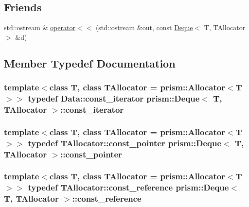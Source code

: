 \subsection*{Friends}
\begin{DoxyCompactItemize}
\item 
std\+::ostream \& \hyperlink{classprism_1_1_deque_a1755aa277c5a41927bb96ce8a0a31299}{operator$<$$<$} (std\+::ostream \&out, const \hyperlink{classprism_1_1_deque}{Deque}$<$ T, T\+Allocator $>$ \&d)
\end{DoxyCompactItemize}


\subsection{Member Typedef Documentation}
\subsubsection[{\texorpdfstring{const\+\_\+iterator}{const_iterator}}]{\setlength{\rightskip}{0pt plus 5cm}template$<$class T, class T\+Allocator = prism\+::\+Allocator$<$\+T$>$$>$ typedef Data\+::const\+\_\+iterator {\bf prism\+::\+Deque}$<$ T, T\+Allocator $>$\+::{\bf const\+\_\+iterator}}\hypertarget{classprism_1_1_deque_a264ab74c18a153ed1d225cb7b29d8f17}{}\label{classprism_1_1_deque_a264ab74c18a153ed1d225cb7b29d8f17}
\subsubsection[{\texorpdfstring{const\+\_\+pointer}{const_pointer}}]{\setlength{\rightskip}{0pt plus 5cm}template$<$class T, class T\+Allocator = prism\+::\+Allocator$<$\+T$>$$>$ typedef T\+Allocator\+::const\+\_\+pointer {\bf prism\+::\+Deque}$<$ T, T\+Allocator $>$\+::{\bf const\+\_\+pointer}}\hypertarget{classprism_1_1_deque_a569958f4e74279b18ec0964d820ebded}{}\label{classprism_1_1_deque_a569958f4e74279b18ec0964d820ebded}
\subsubsection[{\texorpdfstring{const\+\_\+reference}{const_reference}}]{\setlength{\rightskip}{0pt plus 5cm}template$<$class T, class T\+Allocator = prism\+::\+Allocator$<$\+T$>$$>$ typedef T\+Allocator\+::const\+\_\+reference {\bf prism\+::\+Deque}$<$ T, T\+Allocator $>$\+::{\bf const\+\_\+reference}}\hypertarget{classprism_1_1_deque_affa26df70d5123f79a59386056e920c3}{}\label{classprism_1_1_deque_affa26df70d5123f79a59386056e920c3}
